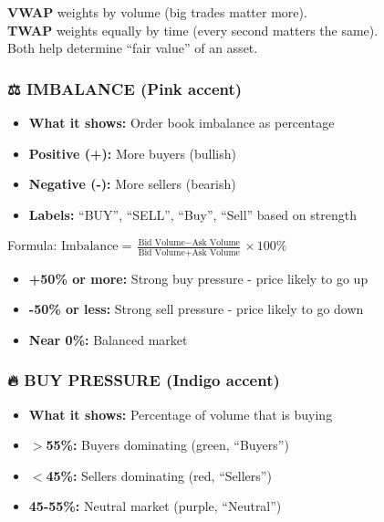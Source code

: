 \documentclass[12pt,a4paper]{article}
\begin{document}
\begin{tipbox}
\textbf{VWAP} weights by volume (big trades matter more).\\
\textbf{TWAP} weights equally by time (every second matters the same).\\
Both help determine ``fair value'' of an asset.
\end{tipbox}

\subsubsection{⚖️ IMBALANCE (Pink accent)}
\begin{itemize}
    \item \textbf{What it shows:} Order book imbalance as percentage
    \item \textbf{Positive (+):} More buyers (bullish)
    \item \textbf{Negative (-):} More sellers (bearish)
    \item \textbf{Labels:} ``BUY'', ``SELL'', ``Buy'', ``Sell'' based on strength
\end{itemize}

\begin{importantbox}
Formula: $\text{Imbalance} = \frac{\text{Bid Volume} - \text{Ask Volume}}{\text{Bid Volume} + \text{Ask Volume}} \times 100\%$

\begin{itemize}
    \item \textbf{+50\% or more:} Strong buy pressure - price likely to go up
    \item \textbf{-50\% or less:} Strong sell pressure - price likely to go down
    \item \textbf{Near 0\%:} Balanced market
\end{itemize}
\end{importantbox}

\subsubsection{🔥 BUY PRESSURE (Indigo accent)}
\begin{itemize}
    \item \textbf{What it shows:} Percentage of volume that is buying
    \item \textbf{$>$55\%:} Buyers dominating (green, ``Buyers'')
    \item \textbf{$<$45\%:} Sellers dominating (red, ``Sellers'')
    \item \textbf{45-55\%:} Neutral market (purple, ``Neutral'')
\end{itemize}
\end{document}
